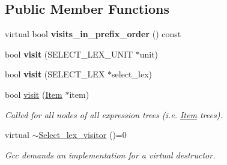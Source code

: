 \subsection*{Public Member Functions}
\begin{DoxyCompactItemize}
\item 
\mbox{\label{classSelect__lex__visitor_ad4806e9af04f07b8267eb225f468a5f4}} 
virtual bool {\bfseries visits\+\_\+in\+\_\+prefix\+\_\+order} () const
\item 
\mbox{\label{classSelect__lex__visitor_a57f7ece7125717780052c1bc6710325a}} 
bool {\bfseries visit} (S\+E\+L\+E\+C\+T\+\_\+\+L\+E\+X\+\_\+\+U\+N\+IT $\ast$unit)
\item 
\mbox{\label{classSelect__lex__visitor_a28dfc6edb2aec752f0b36f4cd37b0239}} 
bool {\bfseries visit} (S\+E\+L\+E\+C\+T\+\_\+\+L\+EX $\ast$select\+\_\+lex)
\item 
\mbox{\label{classSelect__lex__visitor_a91000e2be447a02b2576593343617dd0}} 
bool \mbox{\hyperlink{classSelect__lex__visitor_a91000e2be447a02b2576593343617dd0}{visit}} (\mbox{\hyperlink{classItem}{Item}} $\ast$item)
\begin{DoxyCompactList}\small\item\em Called for all nodes of all expression trees (i.\+e. \mbox{\hyperlink{classItem}{Item}} trees). \end{DoxyCompactList}\item 
\mbox{\label{classSelect__lex__visitor_a9b42e36cf20611d0ac39e2356d2d74d7}} 
virtual \mbox{\hyperlink{classSelect__lex__visitor_a9b42e36cf20611d0ac39e2356d2d74d7}{$\sim$\+Select\+\_\+lex\+\_\+visitor}} ()=0
\begin{DoxyCompactList}\small\item\em Gcc demands an implementation for a virtual destructor. \end{DoxyCompactList}\end{DoxyCompactItemize}
